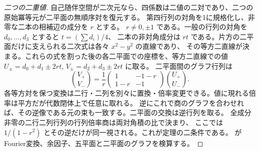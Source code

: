 \begin{proof}[二つの二重値]
自己随伴空間が二次元なら、四係数は二値の二対であり、二つの原始冪等元が二平面の無順序対を復元する。
第四行列の対角を1に規格化し、非零な二本の相補辺の成分を $r$ とする。
$r\ne0,\pm1$ である。一般の行列の対角を $d_0,\ldots,d_3$ とすると $t=(\sum d_i)/4$、
二本の非対角成分は $rt$ である。片方の二平面だけに支えられる二次式は各々 $x^2-y^2$ の直線であり、
その等方二直線が決まる。これらの式を割った後の各二平面での座標を、等方二直線での値
$U_\pm=d_0+d_1\pm2rt$, $V_\pm=d_2+d_3\pm2rt$ に取る。
二平面間のグラフ行列は
\[
 \binom{V_+}{V_-}=\frac1r\begin{pmatrix}1&-1-r\\1-r&-1\end{pmatrix}\binom{U_+}{U_-}.
\]
各等方対を保つ変換は二行・二列を別々に置換・倍率変更できる。値に現れる倍率は平方だが代数閉体上で任意に取れる。
逆にこれで商のグラフを合わせれば、その逆像である元の束も一致する。二平面の交換は逆行列を取る。
全成分非零の二行二列行列の行列倍率商は両対角積の比で決まり、
ここでは $1/(1-r^2)$ とその逆だけが同一視される。これが定理の二条件である。
 がFourier変換、余因子、五平面と二平面のグラフを検算する。
\end{proof}
